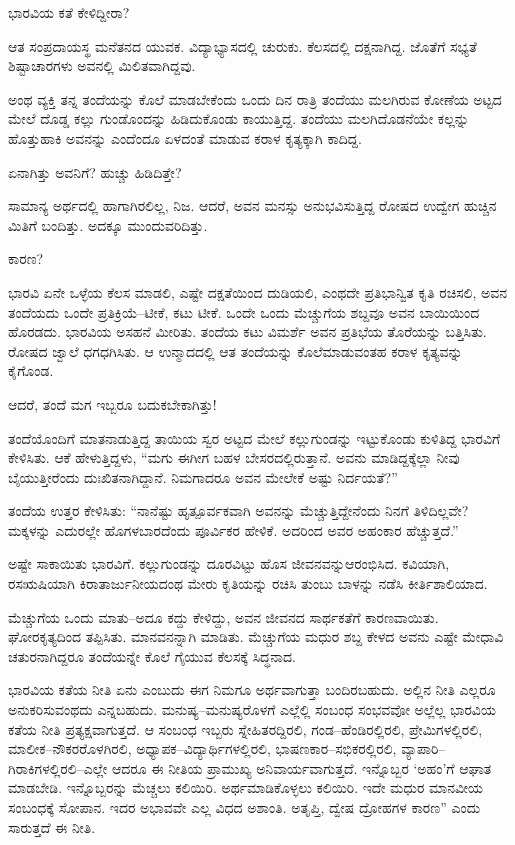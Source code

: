 
ಭಾರವಿಯ ಕತೆ ಕೇಳಿದ್ದೀರಾ?

ಆತ ಸಂಪ್ರದಾಯಸ್ಥ ಮನೆತನದ ಯುವಕ. ವಿದ್ಯಾಭ್ಯಾಸದಲ್ಲಿ ಚುರುಕು. ಕೆಲಸದಲ್ಲಿ ದಕ್ಷನಾಗಿದ್ದ. ಜೊತೆಗೆ ಸಭ್ಯತೆ ಶಿಷ್ಟಾಚಾರಗಳು ಅವನಲ್ಲಿ ಮಿಲಿತವಾಗಿದ್ದವು.

ಅಂಥ ವ್ಯಕ್ತಿ ತನ್ನ ತಂದೆಯನ್ನು ಕೊಲೆ ಮಾಡಬೇಕೆಂದು ಒಂದು ದಿನ ರಾತ್ರಿ ತಂದೆಯು ಮಲಗಿರುವ ಕೋಣೆಯ ಅಟ್ಟದ ಮೇಲೆ ದೊಡ್ಡ ಕಲ್ಲು ಗುಂಡೊಂದನ್ನು ಹಿಡಿದುಕೊಂಡು ಕಾಯು\-ತ್ತಿದ್ದ. ತಂದೆಯು ಮಲಗಿದೊಡನೆಯೇ ಕಲ್ಲನ್ನು ಹೊತ್ತುಹಾಕಿ ಅವನನ್ನು ಎಂದೆಂದೂ ಏಳದಂತೆ ಮಾಡುವ ಕರಾಳ ಕೃತ್ಯಕ್ಕಾಗಿ ಕಾದಿದ್ದ.

ಏನಾಗಿತ್ತು ಅವನಿಗೆ? ಹುಚ್ಚು ಹಿಡಿದಿತ್ತೇ?

ಸಾಮಾನ್ಯ ಅರ್ಥದಲ್ಲಿ ಹಾಗಾಗಿರಲಿಲ್ಲ, ನಿಜ. ಆದರೆ, ಅವನ ಮನಸ್ಸು ಅನುಭವಿಸುತ್ತಿದ್ದ ರೋಷದ ಉದ್ವೇಗ ಹುಚ್ಚಿನ ಮಿತಿಗೆ ಬಂದಿತ್ತು. ಅದಕ್ಕೂ ಮುಂದುವರಿದಿತ್ತು.

ಕಾರಣ?

ಭಾರವಿ ಏನೇ ಒಳ್ಳೆಯ ಕೆಲಸ ಮಾಡಲಿ, ಎಷ್ಟೇ ದಕ್ಷತೆಯಿಂದ ದುಡಿಯಲಿ, ಎಂಥದೇ ಪ್ರತಿಭಾನ್ವಿತ ಕೃತಿ ರಚಿಸಲಿ, ಅವನ ತಂದೆಯದು ಒಂದೇ ಪ್ರತಿಕ್ರಿಯೆ–ಟೀಕೆ, ಕಟು ಟೀಕೆ. ಒಂದೇ ಒಂದು ಮೆಚ್ಚುಗೆಯ ಶಬ್ದವೂ ಅವನ ಬಾಯಿಯಿಂದ ಹೊರಡದು. ಭಾರವಿಯ ಅಸಹನೆ ಮೀರಿತು. ತಂದೆಯ ಕಟು ವಿಮರ್ಶೆ ಅವನ ಪ್ರತಿಭೆಯ ತೊರೆಯನ್ನು ಬತ್ತಿಸಿತು. ರೋಷದ ಜ್ವಾಲೆ ಧಗಧಗಿಸಿತು. ಆ ಉನ್ಮಾದದಲ್ಲಿ ಆತ ತಂದೆಯನ್ನು ಕೊಲೆಮಾಡುವಂತಹ ಕರಾಳ ಕೃತ್ಯವನ್ನು ಕೈಗೊಂಡ.

ಆದರೆ, ತಂದೆ ಮಗ ಇಬ್ಬರೂ ಬದುಕಬೇಕಾಗಿತ್ತು!

ತಂದೆಯೊಂದಿಗೆ ಮಾತನಾಡುತ್ತಿದ್ದ ತಾಯಿಯ ಸ್ವರ ಅಟ್ಟದ ಮೇಲೆ ಕಲ್ಲುಗುಂಡನ್ನು ಇಟ್ಟುಕೊಂಡು ಕುಳಿತಿದ್ದ ಭಾರವಿಗೆ ಕೇಳಿಸಿತು. ಆಕೆ ಹೇಳುತ್ತಿದ್ದಳು, “ಮಗು ಈಗೀಗ ಬಹಳ ಬೇಸರ\-ದಲ್ಲಿರುತ್ತಾನೆ. ಅವನು ಮಾಡಿದ್ದಕ್ಕೆಲ್ಲಾ ನೀವು ಬೈಯುತ್ತೀರೆಂದು ದುಃಖಿತನಾಗಿದ್ದಾನೆ. ನಿಮಗಾ\-ದರೂ ಅವನ ಮೇಲೇಕೆ ಅಷ್ಟು ನಿರ್ದಯತೆ?”

ತಂದೆಯ ಉತ್ತರ ಕೇಳಿಸಿತು: “ನಾನೆಷ್ಟು ಹೃತ್ಪೂರ್ವಕವಾಗಿ ಅವನನ್ನು ಮೆಚ್ಚುತ್ತಿದ್ದೇನೆಂದು ನಿನಗೆ ತಿಳಿದಿಲ್ಲವೇ? ಮಕ್ಕಳನ್ನು ಎದುರಲ್ಲೇ ಹೊಗಳಬಾರದೆಂದು ಪೂರ್ವಿಕರ ಹೇಳಿಕೆ. ಅದರಿಂದ ಅವರ ಅಹಂಕಾರ ಹೆಚ್ಚುತ್ತದೆ.”

ಅಷ್ಟೇ ಸಾಕಾಯಿತು ಭಾರವಿಗೆ. ಕಲ್ಲುಗುಂಡನ್ನು ದೂರವಿಟ್ಟು ಹೊಸ ಜೀವನವನ್ನು\break ಆರಂಭಿಸಿದ. ಕವಿಯಾಗಿ, ರಸಋಷಿಯಾಗಿ ಕಿರಾತಾರ್ಜುನೀಯದಂಥ ಮೇರು ಕೃತಿಯನ್ನು ರಚಿಸಿ ತುಂಬು ಬಾಳನ್ನು ನಡೆಸಿ ಕೀರ್ತಿಶಾಲಿಯಾದ.

ಮೆಚ್ಚುಗೆಯ ಒಂದು ಮಾತು–ಅದೂ ಕದ್ದು ಕೇಳಿದ್ದು, ಅವನ ಜೀವನದ ಸಾರ್ಥಕತೆಗೆ ಕಾರಣವಾಯಿತು. ಘೋರಕೃತ್ಯದಿಂದ ತಪ್ಪಿಸಿತು. ಮಾನವನನ್ನಾಗಿ ಮಾಡಿತು. ಮೆಚ್ಚುಗೆಯ ಮಧುರ ಶಬ್ದ ಕೇಳದ ಅವನು ಎಷ್ಟೇ ಮೇಧಾವಿ ಚತುರನಾಗಿದ್ದರೂ ತಂದೆಯನ್ನೇ ಕೊಲೆ ಗೈಯುವ ಕೆಲಸಕ್ಕೆ ಸಿದ್ಧನಾದ.

ಭಾರವಿಯ ಕತೆಯ ನೀತಿ ಏನು ಎಂಬುದು ಈಗ ನಿಮಗೂ ಅರ್ಥವಾಗುತ್ತಾ ಬಂದಿರಬಹುದು. ಅಲ್ಲಿನ ನೀತಿ ಎಲ್ಲರೂ ಅನುಕರಿಸುವಂಥದು ಎನ್ನಬಹುದು. ಮನುಷ್ಯ–ಮನುಷ್ಯ\-ರೊಳಗೆ ಎಲ್ಲೆಲ್ಲಿ ಸಂಬಂಧ ಸಂಭವವೋ ಅಲ್ಲೆಲ್ಲ ಭಾರವಿಯ ಕತೆಯ ನೀತಿ ಪ್ರತ್ಯಕ್ಷವಾಗುತ್ತದೆ. ಆ ಸಂಬಂಧ ಇಬ್ಬರು ಸ್ನೇಹಿತರದ್ದಿರಲಿ, ಗಂಡ–ಹೆಂಡಿರಲ್ಲಿರಲಿ, ಪ್ರೇಮಿಗಳಲ್ಲಿರಲಿ, ಮಾಲೀಕ–ನೌಕರರೊಳಗಿರಲಿ, ಅಧ್ಯಾಪಕ–ವಿದ್ಯಾರ್ಥಿಗಳಲ್ಲಿರಲಿ, ಭಾಷಣಕಾರ–ಸಭಿಕರಲ್ಲಿರಲಿ, ವ್ಯಾಪಾರಿ–ಗಿರಾಕಿಗಳಲ್ಲಿರಲಿ–ಎಲ್ಲೇ ಆದರೂ ಈ ನೀತಿಯ ಪ್ರಾಮುಖ್ಯ ಅನಿವಾರ್ಯವಾಗುತ್ತದೆ. ಇನ್ನೊಬ್ಬರ ‘ಅಹಂ’ಗೆ ಆಘಾತ ಮಾಡಬೇಡಿ. ಇನ್ನೊಬ್ಬರನ್ನು ಮೆಚ್ಚಲು ಕಲಿಯಿರಿ. ಅರ್ಥಮಾಡಿಕೊಳ್ಳಲು ಕಲಿಯಿರಿ. ಇದೇ ಮಧುರ ಮಾನವೀಯ ಸಂಬಂಧಕ್ಕೆ ಸೋಪಾನ. ಇದರ ಅಭಾವವೇ ಎಲ್ಲ ವಿಧದ ಅಶಾಂತಿ. ಅತೃಪ್ತಿ, ದ್ವೇಷ ದ್ರೋಹಗಳ ಕಾರಣ” ಎಂದು ಸಾರುತ್ತದೆ ಈ ನೀತಿ.

